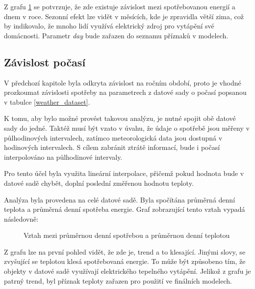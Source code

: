 \documentclass[FM,BP,fonts]{tulthesis}
\begin{document}
Z grafu \ref{fig:year_avg_all} se potvrzuje, že zde existuje závislost mezi spotřebovanou energií a dnem v roce. Sezonní efekt lze vidět v měsících, kde je zpravidla větší zima, což by indikovalo, že mnoho lidí využívá elektrický zdroj pro vytápění své domácnosti. Parametr \textit{day} bude zařazen do seznamu příznaků v modelech.

\subsection{Závislost počasí}
V předchozí kapitole byla odkryta závislost na ročním období, proto je vhodné prozkoumat závislosti spotřeby na parametrech z datové sady o počasí popsanou v tabulce \ref{weather_dataset}.

K tomu, aby bylo možné provést takovou analýzu, je nutné spojit obě datové sady do jedné. Taktéž musí být vzato v úvahu, že údaje o spotřebě jsou měřeny v půlhodinových intervalech, zatímco meteorologická data jsou dostupná v hodinových intervalech. S cílem zabránit ztrátě informací, bude i počasí interpolováno na půlhodinové intervaly.

Pro tento účel byla využita lineární interpolace, přičemž pokud hodnota bude v datové sadě chybět, doplní poslední změřenou hodnotu teploty.

Analýza byla provedena na celé datové sadě. Byla spočítána průměrná denní teplota a průměrná denní spotřeba energie. Graf zobrazující tento vztah vypadá následovně:

\begin{figure}[htbp]
	\centering
	\caption{Vztah mezi průměrnou denní spotřebou a průměrnou denní teplotou}
	\label{fig:year_avg_all}
\end{figure}

Z grafu lze na první pohled vidět, že zde je, trend a to klesající. Jinými slovy, se zvyšující se teplotou klesá spotřebovaná energie. To může být způsobeno tím, že objekty v datové sadě využívají elektrického tepelného vytápění. Jelikož z grafu je patrný trend, byl příznak teploty zařazen pro použití ve finálních modelech.
\end{document}
